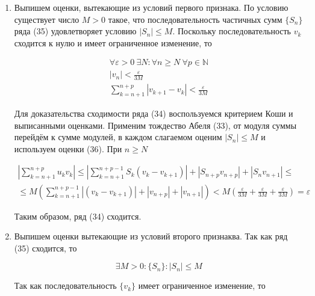 \begin{enumerate}
	\item Выпишем оценки, вытекающие из условий первого признака. По условию существует число $M > 0$ такое, что последовательность частичных сумм $\{S_n\}$ ряда (35) удовлетворяет условию $|S_n| \leqslant M$. Поскольку последовательность $v_k$ сходится к нулю и имеет ограниченное изменение, то
	
	\begin{equation}
		\begin{gathered}
			\forall\varepsilon > 0\ \exists N\colon \forall n \geqslant N \ \forall p \in \mathbb{N} \\
			|v_n| < \frac{\varepsilon}{3M} \\
			\displaystyle\sum_{k = n + 1}^{n + p} |v_{k + 1} - v_k| < \frac{\varepsilon}{3M}
		\end{gathered}
	\end{equation}
	
	Для доказательства сходимости ряда (34) воспользуемся критерием Коши и выписанными оценками. Применим тождество Абеля (33), от модуля суммы перейдём к сумме модулей, в каждом слагаемом оценим $|S_n| \leqslant M$ и используем оценки (36). При $n \geqslant N$
	
	\begin{equation*}
		\begin{gathered}
			\left| \displaystyle\sum_{k = n + 1}^{n + p}u_kv_k \right| \leqslant \left| \displaystyle\sum_{k = n + 1}^{n + p - 1}S_k(v_k - v_{k + 1}) \right| + |S_{n + p}v_{n + p}| + |S_nv_{n + 1}| \leqslant \\
			\leqslant M\left( \displaystyle\sum_{k = n + 1}^{n + p - 1}|(v_k - v_{k + 1})| + |v_{n + p}| + |v_{n + 1}| \right) < M \left( \frac{\varepsilon}{3M} +  \frac{\varepsilon}{3M} + \frac{\varepsilon}{3M} \right) = \varepsilon
		\end{gathered}
	\end{equation*}
	
	Таким образом, ряд (34) сходится.
	
	\item Выпишем оценки вытекающие из условий второго признаква. Так как ряд (35) сходится, то
	
	\begin{equation*}
		\exists M > 0 \colon \{S_n\} \colon |S_n| \leqslant M
	\end{equation*}
	
	Так как последовательность $\{v_k\}$ имеет ограниченное изменение, то
	

\end{enumerate}

